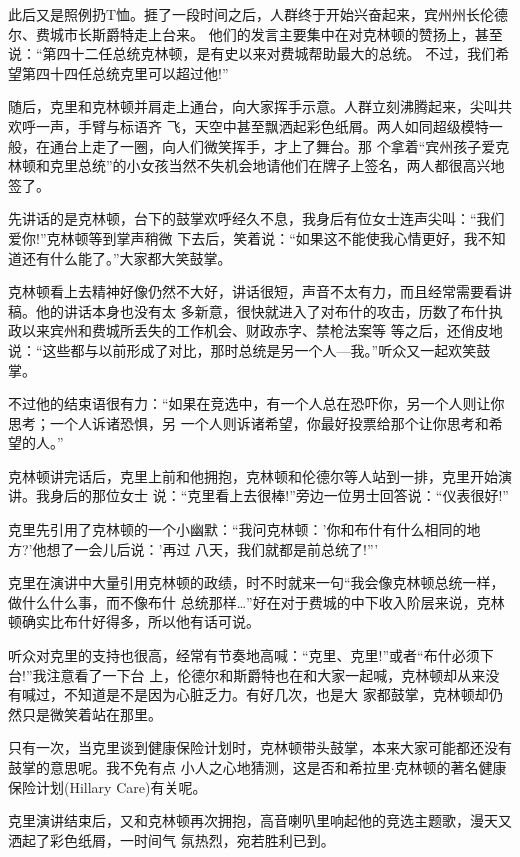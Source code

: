 ﻿\documentclass[11pt]{article}
\begin{document}
此后又是照例扔T恤。捱了一段时间之后，人群终于开始兴奋起来，宾州州长伦德尔、费城市长斯爵特走上台来。
他们的发言主要集中在对克林顿的赞扬上，甚至说：``第四十二任总统克林顿，是有史以来对费城帮助最大的总统。
不过，我们希望第四十四任总统克里可以超过他!''

随后，克里和克林顿并肩走上通台，向大家挥手示意。人群立刻沸腾起来，尖叫共欢呼一声，手臂与标语齐
飞，天空中甚至飘洒起彩色纸屑。两人如同超级模特一般，在通台上走了一圈，向人们微笑挥手，才上了舞台。那
个拿着``宾州孩子爱克林顿和克里总统''的小女孩当然不失机会地请他们在牌子上签名，两人都很高兴地签了。

先讲话的是克林顿，台下的鼓掌欢呼经久不息，我身后有位女士连声尖叫：``我们爱你!''克林顿等到掌声稍微
下去后，笑着说：``如果这不能使我心情更好，我不知道还有什么能了。''大家都大笑鼓掌。

克林顿看上去精神好像仍然不大好，讲话很短，声音不太有力，而且经常需要看讲稿。他的讲话本身也没有太
多新意，很快就进入了对布什的攻击，历数了布什执政以来宾州和费城所丢失的工作机会、财政赤字、禁枪法案等
等之后，还俏皮地说：``这些都与以前形成了对比，那时总统是另一个人---我。''听众又一起欢笑鼓掌。

不过他的结束语很有力：``如果在竞选中，有一个人总在恐吓你，另一个人则让你思考；一个人诉诸恐惧，另
一个人则诉诸希望，你最好投票给那个让你思考和希望的人。''

克林顿讲完话后，克里上前和他拥抱，克林顿和伦德尔等人站到一排，克里开始演讲。我身后的那位女士
说：``克里看上去很棒!''旁边一位男士回答说：``仪表很好!''

克里先引用了克林顿的一个小幽默：``我问克林顿：'你和布什有什么相同的地方?'他想了一会儿后说：'再过
八天，我们就都是前总统了!'''

克里在演讲中大量引用克林顿的政绩，时不时就来一句``我会像克林顿总统一样，做什么什么事，而不像布什
总统那样\ldots ''好在对于费城的中下收入阶层来说，克林顿确实比布什好得多，所以他有话可说。

听众对克里的支持也很高，经常有节奏地高喊：``克里、克里!''或者``布什必须下台!''我注意看了一下台
上，伦德尔和斯爵特也在和大家一起喊，克林顿却从来没有喊过，不知道是不是因为心脏乏力。有好几次，也是大
家都鼓掌，克林顿却仍然只是微笑着站在那里。

只有一次，当克里谈到健康保险计划时，克林顿带头鼓掌，本来大家可能都还没有鼓掌的意思呢。我不免有点
小人之心地猜测，这是否和希拉里$\cdot$克林顿的著名健康保险计划(Hillary Care)有关呢。

克里演讲结束后，又和克林顿再次拥抱，高音喇叭里响起他的竞选主题歌，漫天又洒起了彩色纸屑，一时间气
氛热烈，宛若胜利已到。
\end{document}
